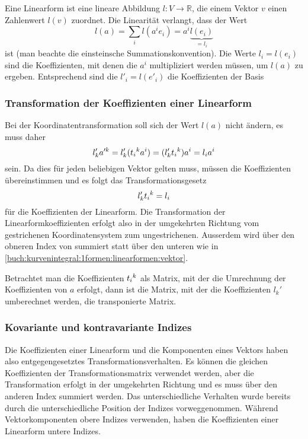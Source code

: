 Eine Linearform ist eine lineare Abbildung $l\colon V\to\mathbb{R}$,
die einem Vektor $v$ einen Zahlenwert $l(v)$ zuordnet.
Die Linearität verlangt, dass der Wert
\[
l(a)
=
\sum_i
l(a^ie_i)
=
a^i \underbrace{l(e_i)}_{\displaystyle=l_i}
\]
ist (man beachte die einsteinsche Summationskonvention).
Die Werte $l_i=l(e_i)$ sind die Koeffizienten, mit denen die $a^i$
multipliziert werden müssen, um $l(a)$ zu ergeben.
Entsprechend sind die $l'_i=l(e'_i)$ die Koeffizienten der Basis

%
%
\subsubsection{Transformation der Koeffizienten einer Linearform}
Bei der Koordinatentransformation soll sich der Wert $l(a)$ nicht
ändern, es muss daher
\[
l'_k
a'^k
=
l'_k
(t_i\mathstrut^k a^i)
=
(l'_kt_i\mathstrut^k) a^i
=
l_i
a^i
\]
sein.
Da dies für jeden beliebigen Vektor gelten muss, müssen die Koeffizienten
übereinstimmen und es folgt das Transformationsgesetz
\begin{equation}
l'_kt_i\mathstrut^k
=
l_i
\label{buch:kurvenintegral:1formen:linearformen:linearform}
\end{equation}
für die Koeffizienten der Linearform.
Die Transformation der Linearformkoeffizienten erfolgt also
in der umgekehrten Richtung vom gestrichenen Koordinatensystem 
zum ungestrichenen.
Ausserdem wird über den obneren Index von summiert statt über
den unteren wie in 
\eqref{buch:kurvenintegral:1formen:linearformen:vektor}.

Betrachtet man die Koeffizienten $t_i\mathstrut^k$ als Matrix, mit der
die Umrechnung der Koeffizienten von $a$ erfolgt, dann ist die Matrix,
mit der die Koeffizienten $l_k'$ umberechnet werden, die transponierte
Matrix.

%
%
\subsubsection{Kovariante und kontravariante Indizes}
Die Koeffizienten einer Linearform und die Komponenten eines Vektors 
haben also entgegengesetztes Transformationsverhalten.
Es können die gleichen Koeffizienten der Transformationsmatrix 
verwendet werden, aber die Transformation erfolgt in der umgekehrten
Richtung und es muss über den anderen Index summiert werden.
Das unterschiedliche Verhalten wurde bereits durch die unterschiedliche
Position der Indizes vorweggenommen.
Während Vektorkomponenten obere Indizes verwenden, haben die
Koeffizienten einer Linearform untere Indizes.

